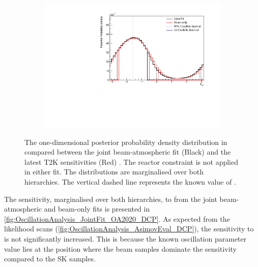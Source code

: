 \begin{figure}[h]
  \begin{subfigure}[t]{0.98\textwidth}
    \includegraphics[width=\textwidth, trim={0mm 0mm 0mm 0mm}, clip,page=1]{Figures/OA/JointFit_OA2020_Comp/ContourComparison_1D_dcp_BH_2_woRC_UnSmeared_CredibleInterval.pdf}
  \end{subfigure}
  \caption{The one-dimensional posterior probability density distribution in  compared between the joint beam-atmospheric fit (Black) and the latest T2K sensitivities (Red) \cite{Dunne2020-uf, t2k_tn_393}. The reactor constraint is not applied in either fit. The distributions are marginalised over both hierarchies. The vertical dashed line represents the known value of .}
  \label{fig:OscillationAnalysis_JointFit_OA2020_DCP}
\end{figure}

The sensitivity, marginalised over both hierarchies, to  from the joint beam-atmospheric and beam-only fits is presented in \autoref{fig:OscillationAnalysis_JointFit_OA2020_DCP}. As expected from the likelihood scans (\autoref{fig:OscillationAnalysis_AsimovEval_DCP}), the sensitivity to  is not significantly increased. This is because the known oscillation parameter value lies at the position where the beam samples dominate the sensitivity compared to the SK samples.


